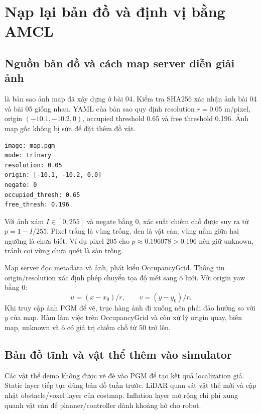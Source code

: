 \clearpage
\section{Nạp lại bản đồ và định vị bằng AMCL}
\subsection{Nguồn bản đồ và cách map server diễn giải ảnh}
 là bản sao ảnh map đã xây dựng ở bài 04. Kiểm tra SHA256 xác nhận ảnh bài 04 và bài 05 giống nhau. YAML của bản sao quy định resolution $r=0.05$ m/pixel, origin $(-10.1,-10.2,0)$, occupied threshold 0.65 và free threshold 0.196. Ảnh map gốc không bị sửa để đặt thêm đồ vật.
\begin{lstlisting}[caption={Các trường của map YAML dùng trong bài 05},label={lst:map}]
image: map.pgm
mode: trinary
resolution: 0.05
origin: [-10.1, -10.2, 0.0]
negate: 0
occupied_thresh: 0.65
free_thresh: 0.196
\end{lstlisting}
Với ảnh xám $I\in[0,255]$ và negate bằng 0, xác suất chiếm chỗ được suy ra từ $p=1-I/255$. Pixel trắng là vùng trống, đen là vật cản; vùng nằm giữa hai ngưỡng là chưa biết. Ví dụ pixel 205 cho $p\approx0.196078>0.196$ nên giữ unknown, tránh coi vùng chưa quét là sàn trống.

Map server đọc metadata và ảnh, phát  kiểu OccupancyGrid. Thông tin origin/resolution xác định phép chuyển tọa độ mét sang ô lưới. Với origin yaw bằng 0:
\begin{equation}
u=(x-x_0)/r,\qquad v=(y-y_0)/r.
\end{equation}
Khi truy cập ảnh PGM để vẽ, trục hàng ảnh đi xuống nên phải đảo hướng so với $y$ của map. Hàm  làm việc trên OccupancyGrid và còn xử lý origin quay, biên map, unknown và ô có giá trị chiếm chỗ từ 50 trở lên.

\subsection{Bản đồ tĩnh và vật thể thêm vào simulator}
Các vật thể demo không được vẽ đè vào PGM để tạo kết quả localization giả. Static layer tiếp tục dùng bản đồ tuần trước. LiDAR quan sát vật thể mới và cập nhật obstacle/voxel layer của costmap. Inflation layer mở rộng chi phí xung quanh vật cản để planner/controller dành khoảng hở cho robot.

\clearpage

